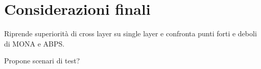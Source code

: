 \documentclass[12pt,a4paper,openright,twoside]{book}
\begin{document}
\clearpage{\pagestyle{empty}\cleardoublepage}


\chapter{Considerazioni finali}
Riprende superiorità di cross layer su single layer e confronta punti
forti e deboli di MONA e ABPS.

Propone scenari di test?

\clearpage{\pagestyle{empty}\cleardoublepage}

\end{document}
